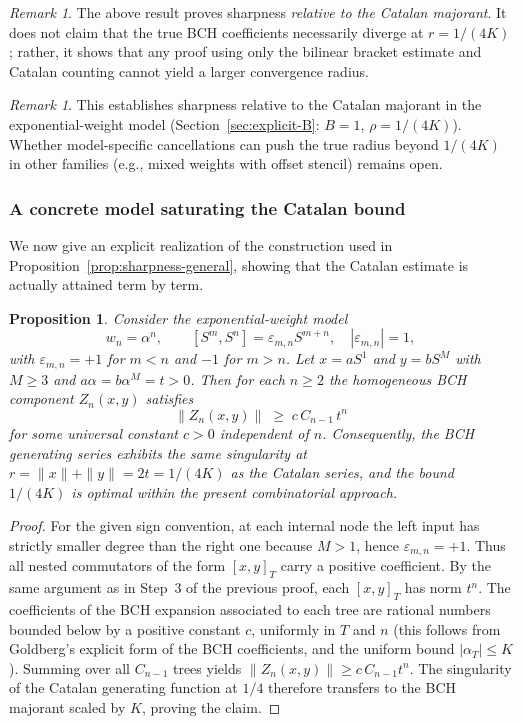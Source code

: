 \documentclass[11pt]{amsart}
\numberwithin{equation}{section}
\newtheorem{proposition}[theorem]{Proposition}
\theoremstyle{remark}
\newtheorem{remark}[theorem]{Remark}
\begin{document}
\begin{remark}
The above result proves sharpness \emph{relative to the Catalan majorant}.
It does not claim that the true BCH coefficients necessarily diverge at $r=1/(4K)$;
rather, it shows that any proof using only the bilinear bracket estimate
and Catalan counting cannot yield a larger convergence radius.
\end{remark}

\begin{remark}
This establishes sharpness relative to the Catalan majorant in the exponential-weight model
(Section~\ref{sec:explicit-B}: $B=1$, $\rho=1/(4K)$). Whether model-specific cancellations can push the true radius
beyond $1/(4K)$ in other families (e.g., mixed weights with offset stencil) remains open.
\end{remark}

\subsubsection{A concrete model saturating the Catalan bound}

We now give an explicit realization of the construction used
in Proposition~\ref{prop:sharpness-general}, showing that the
Catalan estimate is actually attained term by term.

\begin{proposition}
\label{prop:explicit-saturation}
Consider the exponential-weight model
\[
w_n=\alpha^n,\qquad [S^m,S^n]=\varepsilon_{m,n}S^{m+n},
\quad |\varepsilon_{m,n}|=1,
\]
with $\varepsilon_{m,n}=+1$ for $m<n$ and $-1$ for $m>n$.
Let $x=aS^{1}$ and $y=bS^{M}$ with $M\ge3$ and
$a\alpha=b\alpha^M=t>0$.
Then for each $n\ge2$ the homogeneous BCH component $Z_n(x,y)$ satisfies
\[
\|Z_n(x,y)\| \;\ge\; c\,C_{n-1}\,t^n
\]
for some universal constant $c>0$ independent of $n$.
Consequently, the BCH generating series
exhibits the same singularity at $r=\|x\|+\|y\|=2t=1/(4K)$
as the Catalan series, and the bound $1/(4K)$ is optimal
within the present combinatorial approach.
\end{proposition}

\begin{proof}
For the given sign convention, at each internal node the left input
has strictly smaller degree than the right one
because $M>1$, hence $\varepsilon_{m,n}=+1$.
Thus all nested commutators of the form $[x,y]_T$
carry a positive coefficient.
By the same argument as in Step~3 of the previous proof,
each $[x,y]_T$ has norm $t^n$.
The coefficients of the BCH expansion associated to each tree
are rational numbers bounded below by a positive constant $c$,
uniformly in $T$ and $n$ (this follows from Goldberg’s explicit
form of the BCH coefficients, and the uniform bound $|\alpha_T| \leq K$).
Summing over all $C_{n-1}$ trees yields
$\|Z_n(x,y)\| \geq c\,C_{n-1}t^n$.
The singularity of the Catalan generating function at $1/4$
therefore transfers to the BCH majorant scaled by $K$, proving the claim.
\end{proof}
\end{document}
